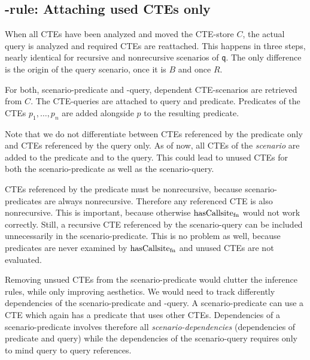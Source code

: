 \iffalse %
$$\inferrule{
    \hasCallsite(T, \WITH a_1 \AS t_1, ..., a_n \AS t_n~q)\\
    T, \varnothing \vdash (p, t_1) \rightarrow (B, R) \\
    ((B \times \{\bot\}) \cup (R \times \{\top\})) = \{(p'_{t_1}, t'_1, r_{i_1}), ..., (p'_{t_k}, t'_k, r_k)\} = X\\
    \forall (p'_t, t', r_i) \in X: T[a_1 \mapsto r_i], C[a_1: (t', p'_t, \deps(t')] \vdash (p, \WITH a_2 \AS t_2, ..., a_n \AS t_n~q) \rightarrow (B_i, R_i)
}{
    T, C \vdash (p, \WITH a_1 \AS t_1, ..., a_n \AS t_n~q) \rightarrow ((\cup_{1 \leq i \leq k} B_i), (\cup_{1 \leq j \leq k} R_j)\})
}\quad(\textsc{cte})$$
\fi

\subsection{{\normalfont\RWITH}-rule: Attaching used CTEs only}
When all CTEs have been analyzed and moved the CTE-store $C$, the actual query is analyzed and required CTEs are reattached. This happens in three steps, nearly identical for recursive and nonrecursive scenarios of \texttt{q}. The only difference is the origin of the query scenario, once it is $B$ and once $R$.

For both, scenario-predicate and -query, dependent CTE-scenarios are retrieved from $C$. The CTE-queries are attached to query and predicate. Predicates of the CTEs $p_1, \dots, p_n$ are added alongside $p$ to the resulting predicate.

Note that we do not differentiate between CTEs referenced by the predicate only and CTEs referenced by the query only. As of now, all CTEs of the \textit{scenario} are added to the predicate and to the query. This could lead to unused CTEs for both the scenario-predicate as well as the scenario-query.

CTEs referenced by the predicate must be nonrecursive, because scenario-predicates are always nonrecursive. Therefore any referenced CTE is also nonrecursive. This is important, because otherwise $\operatorname{\text{hasCallsite}_{fn}}$ would not work correctly. Still, a recursive CTE referenced by the scenario-query can be included unnecessarily in the scenario-predicate. This is no problem as well, because predicates are never examined by $\operatorname{\text{hasCallsite}_{fn}}$ and unused CTEs are not evaluated.

Removing unsued CTEs from the scenario-predicate would clutter the inference rules, while only improving aesthetics. We would need to track differently dependencies of the scenario-predicate and -query. A scenario-predicate can use a CTE which again has a predicate that uses other CTEs. Dependencies of a scenario-predicate involves therefore all \textit{scenario-dependencies} (dependencies of predicate and query) while the dependencies of the scenario-query requires only to mind query to query references.

